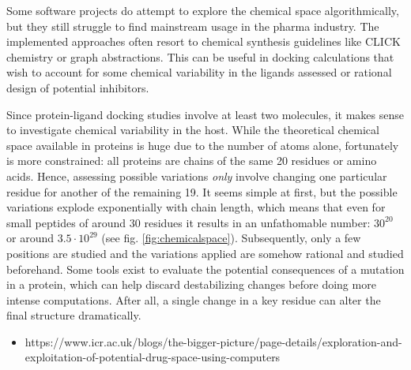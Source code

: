 Some software projects do attempt to explore the chemical space algorithmically,\cite{oprea2001chemography,bon2010bioactivity,larsson2007chemgps} but they still struggle to find mainstream usage in the pharma industry. The implemented approaches often resort to chemical synthesis guidelines like CLICK chemistry\cite{durrant2009} or graph abstractions.\cite{andersen2014} This can be useful in docking calculations that wish to account for some chemical variability in the ligands assessed or rational design of potential inhibitors.

Since protein-ligand docking studies involve at least two molecules, it makes sense to investigate chemical variability in the host. While the theoretical chemical space available in proteins is huge due to the number of atoms alone, fortunately is more constrained: all proteins are chains of the same 20 residues or amino acids. Hence, assessing possible variations \textit{only} involve changing one particular residue for another of the remaining 19. It seems simple at first, but the possible variations explode exponentially with chain length, which means that even for small peptides of around 30 residues it results in an unfathomable number: $ 30^{20} $ or around $ 3.5·10^{29} $ (see fig. \ref{fig:chemicalspace}). Subsequently, only a few positions are studied and the variations applied are somehow rational and studied beforehand. Some tools exist to evaluate the potential consequences of a mutation in a protein,\cite{kumar2009predicting,quan2016strum,fariselli2015inps,dehouck2011popmusic} which can help discard destabilizing changes before doing more intense computations. After all, a single change in a key residue can alter the final structure dramatically.\cite{kumar2006protherm}

\begin{itemize}
	\item https://www.icr.ac.uk/blogs/the-bigger-picture/page-details/exploration-and-exploitation-of-potential-drug-space-using-computers
\end{itemize}

